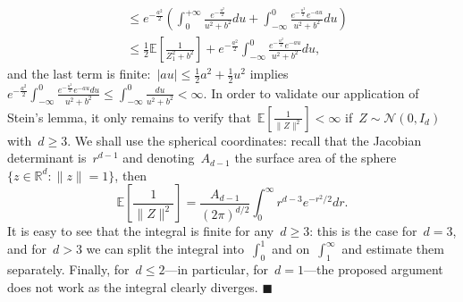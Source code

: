 \documentclass[11pt]{article}
\newcommand{\R}{\mathds{R}}
\newcommand{\E}{\mathds{E}}
\newcommand{\cN}{\mathcal{N}}
\newcommand{\leqs}{\leqslant}
\newcommand{\geqs}{\geqslant}
\renewcommand{\le}{\leqs}
\renewcommand{\ge}{\geqs}
\begin{document}
\begin{itemize}
{\[\begin{aligned}
&\le e^{-\frac{a^2}{2}} \left( \int_{0}^{+\infty} \frac{e^{-\frac{u^2}{2}}}{u^2 + b^2} du + \int_{- \infty}^{0} \frac{e^{-\frac{u^2}{2}} e^{-au}}{u^2 + b^2} du \right) \\
&\le \frac{1}{2} \E \left[\frac{1}{Z_1^2 + b^2}\right] + e^{-\frac{a^2}{2}} \int_{- \infty}^{0} \frac{e^{-\frac{u^2}{2}} e^{-au}}{u^2 + b^2} du, 
\end{aligned}
\]
and the last term is finite:~$|au| \le \frac{1}{2} a^2 + \frac{1}{2}u^2$ implies
$
e^{-\frac{a^2}{2}} \int_{- \infty}^{0} \frac{e^{-\frac{u^2}{2}} e^{-au}du}{u^2 + b^2}  
\le \int_{- \infty}^{0} \frac{du}{u^2 + b^2}  < \infty.
$
In order to validate our application of Stein's lemma, it only remains to verify that~$\E[\frac{1}{\|Z\|^2}] < \infty$ if~$Z \sim \cN(0,I_d)$ with~$d \ge 3$. We shall use the spherical coordinates: recall that the Jacobian determinant is~$r^{d-1}$ and denoting~$A_{d-1}$ the surface area of the sphere~$\{z \in \R^d: \|z\| = 1\}$, then
\[
\E \left[\frac{1}{\|Z\|^2} \right] = \frac{A_{d-1}}{(2\pi)^{d/2}} \int_0^{\infty} 
r^{d-3} e^{-r^2/2} dr.
\]
It is easy to see that the integral is finite for any~$d \ge 3$: this is the case for~$d = 3$, and for~$d > 3$ we can split the integral into~$\int_0^1$ and on~$\int_1^{\infty}$ and estimate them separately.
Finally, for~$d \le 2$---in particular, for~$d=1$---the proposed argument does not work as the integral clearly diverges.
\hfill $\blacksquare$
}
\end{itemize}
\end{document}
